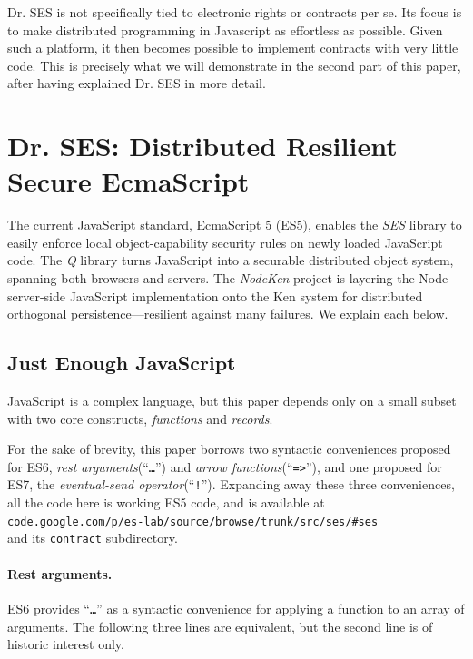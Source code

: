 \documentclass{llncs}
\begin{document}

Dr. SES is not specifically tied to electronic rights or contracts per se. Its focus is to make distributed programming in Javascript as effortless as possible. Given such a platform, it then becomes possible to implement contracts with very little code. This is precisely what we will demonstrate in the second part of this paper, after having explained Dr. SES in more detail.

\section{Dr. SES: Distributed Resilient Secure EcmaScript}

The current JavaScript standard, EcmaScript 5 (ES5), enables the \emph{SES} library to easily enforce local object-capability security rules on newly loaded JavaScript code. The \emph{Q} library turns JavaScript into a securable distributed object system, spanning both browsers and servers. The \emph{NodeKen} project is layering the Node server-side JavaScript implementation onto the Ken system for distributed orthogonal persistence---resilient against many failures. We explain each below.

\subsection{Just Enough JavaScript}

JavaScript is a complex language, but this paper depends only on a small subset with two core constructs, \emph{functions} and \emph{records}. 

For the sake of brevity, this paper borrows two syntactic conveniences proposed for ES6, \emph{rest arguments}(``{\tt \ldots}'') and \emph{arrow functions}(``{\tt =>}''), and one proposed for ES7, the \emph{eventual-send operator}(``{\tt !}''). Expanding away these three conveniences, all the code here is working ES5 code, and is available at \\
{\tt code.google.com/p/es-lab/source/browse/trunk/src/ses/\#ses} \\
and its {\tt contract} subdirectory.

\paragraph{Rest arguments.} ES6 provides ``{\tt \ldots}'' as a syntactic convenience for applying a function to an array of arguments. The following three lines are equivalent, but the second line is of historic interest only.
\end{document}
